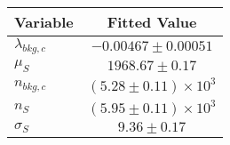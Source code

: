 \begin{tabular}[t]{lc}
\hline
Variable &Fitted Value\\
\hline\hline
$\lambda_{bkg,c}$&$-0.00467\pm0.00051$\\
\hline
$\mu_{S}$&$1968.67\pm0.17$\\
\hline
$n_{bkg,c}$&$(5.28\pm0.11)\times 10^3$\\
\hline
$n_{S}$&$(5.95\pm0.11)\times 10^3$\\
\hline
$\sigma_{S}$&$9.36\pm0.17$\\
\hline
\end{tabular}